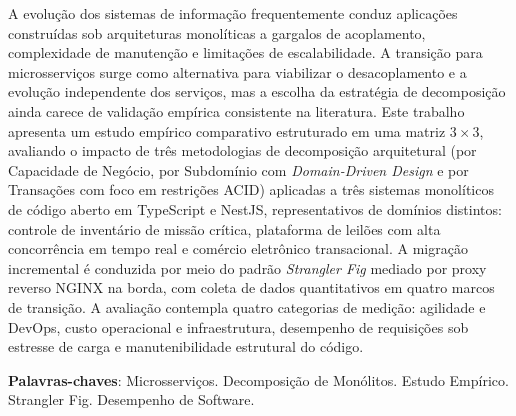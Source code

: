\begin{resumo}
A evolução dos sistemas de informação frequentemente conduz aplicações construídas sob arquiteturas monolíticas a gargalos de acoplamento, complexidade de manutenção e limitações de escalabilidade. A transição para microsserviços surge como alternativa para viabilizar o desacoplamento e a evolução independente dos serviços, mas a escolha da estratégia de decomposição ainda carece de validação empírica consistente na literatura. Este trabalho apresenta um estudo empírico comparativo estruturado em uma matriz $3 \times 3$, avaliando o impacto de três metodologias de decomposição arquitetural (por Capacidade de Negócio, por Subdomínio com \textit{Domain-Driven Design} e por Transações com foco em restrições ACID) aplicadas a três sistemas monolíticos de código aberto em TypeScript e NestJS, representativos de domínios distintos: controle de inventário de missão crítica, plataforma de leilões com alta concorrência em tempo real e comércio eletrônico transacional. A migração incremental é conduzida por meio do padrão \textit{Strangler Fig} mediado por proxy reverso NGINX na borda, com coleta de dados quantitativos em quatro marcos de transição. A avaliação contempla quatro categorias de medição: agilidade e DevOps, custo operacional e infraestrutura, desempenho de requisições sob estresse de carga e manutenibilidade estrutural do código.

	\vspace{\onelineskip}
	
	\noindent
	\textbf{Palavras-chaves}: Microsserviços. Decomposição de Monólitos. Estudo Empírico. Strangler Fig. Desempenho de Software.
\end{resumo}

